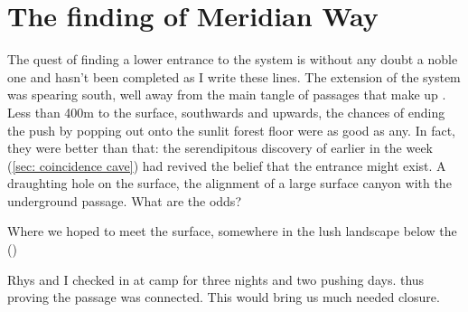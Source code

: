 \section{The finding of Meridian Way}

The quest of finding a lower entrance to the system is without any doubt a noble one and hasn't been completed as I write these lines. The  extension of the system was spearing south, well away from the main tangle of passages that make up . Less than 400m to the surface, southwards and upwards, the chances of ending the push by popping out onto the sunlit forest floor were as good as any. In fact, they were better than that: the serendipitous discovery of  earlier in the week (\vref{sec: coincidence cave}) had revived the belief that the entrance might exist. A draughting hole on the surface, the alignment of a large surface canyon with the underground passage. What are the odds?

\begin{pagefigure}
\checkoddpage \ifoddpage \forcerectofloat \else \forceversofloat \fi
\centering
{}
\caption{Where we hoped to meet the surface, somewhere in the lush landscape below the \protect{} (\protect{}) }
\label{planina na kalu}
\end{pagefigure}

Rhys and I checked in at camp  for three nights and two pushing days.  thus proving the passage was connected. This would bring us much needed closure.

